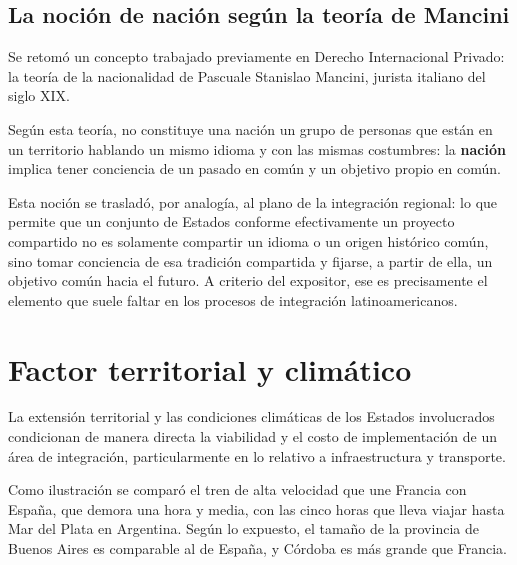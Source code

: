 \documentclass[12pt,oneside]{book}
\begin{document}
\subsection{La noción de nación según la teoría de Mancini}

Se retomó un concepto trabajado previamente en Derecho Internacional Privado: la teoría de la nacionalidad de Pascuale Stanislao Mancini, jurista italiano del siglo XIX.

Según esta teoría, no constituye una nación un grupo de personas que están en un territorio hablando un mismo idioma y con las mismas costumbres: la \textbf{nación} implica tener conciencia de un pasado en común y un objetivo propio en común.

Esta noción se trasladó, por analogía, al plano de la integración regional: lo que permite que un conjunto de Estados conforme efectivamente un proyecto compartido no es solamente compartir un idioma o un origen histórico común, sino tomar conciencia de esa tradición compartida y fijarse, a partir de ella, un objetivo común hacia el futuro. A criterio del expositor, ese es precisamente el elemento que suele faltar en los procesos de integración latinoamericanos.

\section{Factor territorial y climático}

La extensión territorial y las condiciones climáticas de los Estados involucrados condicionan de manera directa la viabilidad y el costo de implementación de un área de integración, particularmente en lo relativo a infraestructura y transporte.

Como ilustración se comparó el tren de alta velocidad que une Francia con España, que demora una hora y media, con las cinco horas que lleva viajar hasta Mar del Plata en Argentina. Según lo expuesto, el tamaño de la provincia de Buenos Aires es comparable al de España, y Córdoba es más grande que Francia.
\end{document}
